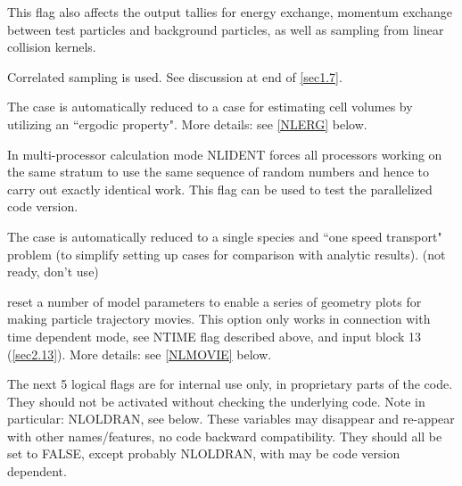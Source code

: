 \begin{description}
        This flag also affects the output tallies for energy exchange, momentum
        exchange between test particles and background particles, as well as sampling
        from linear collision kernels.
  \item[NLCRR] Correlated sampling is used.
        See discussion at end of \cref{sec1.7}.
  \item[NLERG] The case is automatically reduced to a case for estimating cell
        volumes by utilizing an ``ergodic property".
        More details: see \cref{NLERG} below.
  \item[NLIDENT] In multi-processor calculation mode NLIDENT forces all
        processors working on the same stratum to use the same sequence of random
        numbers and hence to carry out exactly identical work.
        This flag can be used to test the parallelized code version.
  \item[NLONE] The case is automatically reduced to a single species and ``one
        speed transport" problem (to simplify setting up cases for comparison with
        analytic results).
        (not ready, don't use)
  \item[NLMOVIE] reset a number of model parameters to
        enable a series of geometry plots for making particle trajectory movies.
        This option only works in connection with time dependent mode, see NTIME flag
        described above, and input block 13 (\cref{sec2.13}).
        More details: see \cref{NLMOVIE} below.
\end{description}
The next 5 logical flags are for internal use only, in proprietary parts of the
code.
They should not be activated without checking the underlying code.
Note in particular:  NLOLDRAN, see below.
These variables may disappear and re-appear with other names/features, no code
backward compatibility.
They should all be set to FALSE, except probably NLOLDRAN, with may be code
version dependent.
